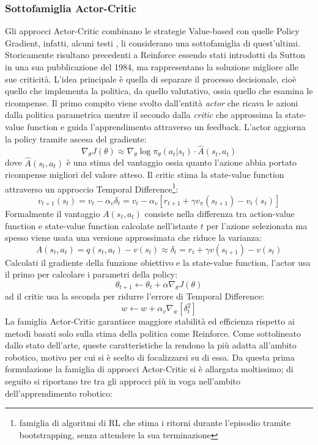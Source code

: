 \subsubsection{Sottofamiglia Actor-Critic}
Gli approcci Actor-Critic combinano le strategie Value-based con quelle Policy Gradient, infatti, alcuni testi \cite{sutton2018reinforcement}, li considerano una sottofamiglia di quest'ultimi. Storicamente risultano precedenti a Reinforce essendo stati introdotti da Sutton in una sua pubblicazione \cite{sutton1984temporal} del 1984, ma rappresentano la soluzione migliore alle sue criticità. L'idea principale è quella di separare il processo decisionale, cioè quello che implementa la politica, da quello valutativo, ossia quello che esamina le ricompense. Il primo compito viene svolto dall'entità \textit{actor} che ricava le azioni dalla politica parametrica mentre il secondo dalla \textit{critic} che approssima la state-value function e guida l'apprendimento attraverso un feedback. L'actor aggiorna la policy tramite ascesa del gradiente:
\begin{equation}
     \nabla_\theta J(\theta)\approx\nabla_\theta \log\pi_\theta(a_t|s_t)\cdot \hat{A}(s_t,a_t)
\end{equation}
dove $\hat{A}(s_t,a_t)$ è una stima del vantaggio ossia quanto l'azione abbia portato ricompense migliori del valore atteso. Il critic stima la state-value function attraverso un approccio Temporal Difference\footnote{famiglia di algoritmi di RL che stima i ritorni durante l'episodio tramite bootstrapping, senza attendere la sua terminazione}:
\begin{equation}
    v_{t+1}(s_t)=v_t-\alpha_v\delta_t=v_t-\alpha_v[r_{t+1}+\gamma v_\pi(s_{t+1})-v_t(s_t)]
\end{equation}
Formalmente il vantaggio $A(s_t,a_t)$ consiste nella differenza tra action-value function e state-value function calcolate nell'istante $t$ per l'azione selezionata ma spesso viene usata una versione approssimata che riduce la varianza:
\begin{equation}
    A(s_t,a_t)=q(s_t,a_t)-v(s_t)\approx \delta_t=r_t+\gamma v(s_{t+1})-v(s_t)
\end{equation}
Calcolati il gradiente della funzione obiettivo e la state-value function, l'actor usa il primo per calcolare i parametri della policy:
\begin{equation}
    \theta_{t+1}\xleftarrow{} \theta_t+\alpha \nabla_\theta J(\theta)
\end{equation}
ad il critic usa la seconda per ridurre l'errore di Temporal Difference:
\begin{equation}
    w\xleftarrow{} w+\alpha_v \nabla_w [\delta_t^2]
\end{equation}
La famiglia Actor-Critic garantisce maggiore stabilità ed efficienza rispetto ai metodi basati solo sulla stima della politica come Reinforce. Come sottolineato dallo stato dell'arte, queste caratteristiche la rendono la più adatta all'ambito robotico, motivo per cui si è scelto di focalizzarsi su di essa. Da questa prima formulazione la famiglia di approcci Actor-Critic si è allargata moltissimo; di seguito si riportano tre tra gli approcci più in voga nell'ambito dell'apprendimento robotico:

